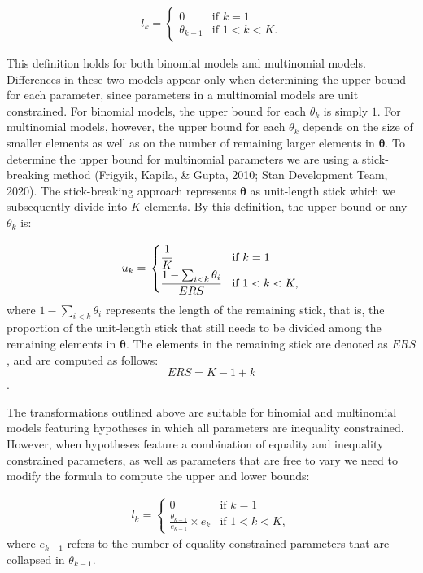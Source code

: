 \documentclass[
  english,
  man,floatsintext]{apa6}
\begin{document}
\begin{appendix}
\begin{align*}
l_k = \left.
\begin{cases}
0 & \text{if } k = 1 \\
\theta_{k - 1} & \text{if } 1 < k < K.
\end{cases}
\right.
\end{align*}

This definition holds for both binomial models and multinomial models.
Differences in these two models appear only when determining the upper
bound for each parameter, since parameters in a multinomial models are
unit constrained. For binomial models, the upper bound for each
\(\theta_k\) is simply \(1\). For multinomial models, however, the upper
bound for each \(\theta_k\) depends on the size of smaller elements as
well as on the number of remaining larger elements in
\(\boldsymbol{\theta}\). To determine the upper bound for multinomial
parameters we are using a stick-breaking method (Frigyik, Kapila, \&
Gupta, 2010; Stan Development Team, 2020). The stick-breaking approach
represents \(\boldsymbol{\theta}\) as unit-length stick which we
subsequently divide into \(K\) elements. By this definition, the upper
bound or any \(\theta_k\) is:

\begin{align}
\label{Eq:upperBound}
u_k = \left.
\begin{cases}
\cfrac{1}{K} & \text{if } k = 1 \\
\cfrac{1 - \sum_{i < k} \theta_i}{ERS} & \text{if } 1 < k < K,
\end{cases}
\right.
\end{align} where \(1 - \sum_{i < k} \theta_i\) represents the length of
the remaining stick, that is, the proportion of the unit-length stick
that still needs to be divided among the remaining elements in
\(\boldsymbol{\theta}\). The elements in the remaining stick are denoted
as \(ERS\), and are computed as follows: \[ERS = K - 1 + k\].

The transformations outlined above are suitable for binomial and
multinomial models featuring hypotheses in which all parameters are
inequality constrained. However, when hypotheses feature a combination
of equality and inequality constrained parameters, as well as parameters
that are free to vary we need to modify the formula to compute the upper
and lower bounds:

\begin{align}
l_k = \left.
\begin{cases}
0 & \text{if } k = 1 \\
\frac{\theta_{k - 1}}{e_{k-1}} \times e_k & \text{if } 1 < k < K,
\end{cases}
\right.
\end{align} where \(e_{k-1}\) refers to the number of equality
constrained parameters that are collapsed in \(\theta_{k - 1}\).


\end{appendix}
\end{document}
